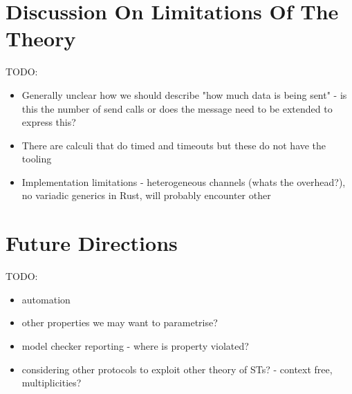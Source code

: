 \documentclass{article}
\newcommand{\todo}[1]{}
\renewcommand{\todo}[1]{{\color{red} TODO: {#1}}}
\begin{document}
\section{Discussion On Limitations Of The Theory}

\todo{
    \begin{itemize}
        \item Generally unclear how we should describe "how much data is being sent" - is this the number of send calls or does the message need to be extended to express this?
        \item There are calculi that do timed and timeouts but these do not have the tooling
        \item Implementation limitations - heterogeneous channels (whats the overhead?), no variadic generics in Rust, will probably encounter other
    \end{itemize}
}

\section{Future Directions}

\todo{
    \begin{itemize}
        \item automation
        \item other properties we may want to parametrise?
        \item model checker reporting - where is property violated?
        \item considering other protocols to exploit other theory of STs? - context free, multiplicities?
    \end{itemize}
}

\medskip
\nocite{*}
\printbibliography
\end{document}
